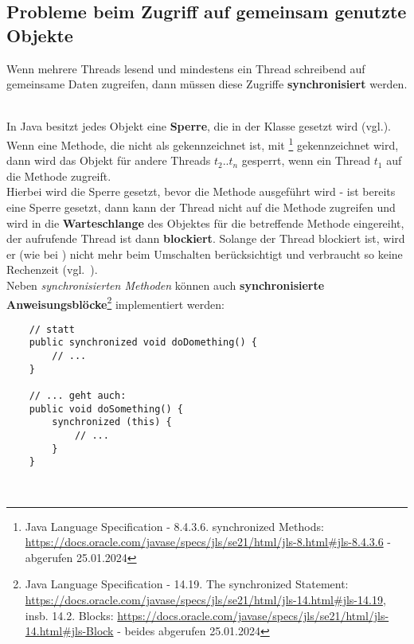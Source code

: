 \subsection{Probleme beim Zugriff auf gemeinsam genutzte Objekte}

\begin{tcolorbox}
   Wenn mehrere Threads lesend und mindestens ein Thread schreibend auf gemeinsame Daten zugreifen, dann müssen diese Zugriffe \textbf{synchronisiert} werden.
\end{tcolorbox}\\

In Java besitzt jedes Objekt eine \textbf{Sperre}, die in der Klasse  gesetzt wird (vgl.\cite[26]{Oec22}).\\

\noindent
Wenn eine Methode, die nicht als  gekennzeichnet ist, mit \footnote{
    Java Language Specification - 8.4.3.6. synchronized Methods: \url{https://docs.oracle.com/javase/specs/jls/se21/html/jls-8.html#jls-8.4.3.6} - abgerufen 25.01.2024
} gekennzeichnet wird, dann wird das Objekt für andere Threads $t_2..t_n$ gesperrt, wenn ein Thread $t_1$ auf die Methode zugreift.\\
Hierbei wird die Sperre gesetzt, bevor die Methode ausgeführt wird - ist bereits eine Sperre gesetzt, dann kann der Thread nicht auf die Methode zugreifen und wird in die \textbf{Warteschlange} des Objektes für die betreffende Methode eingereiht, der aufrufende Thread ist dann \textbf{blockiert}.
Solange der Thread blockiert ist, wird er (wie bei ) nicht mehr beim Umschalten berücksichtigt und verbraucht so keine Rechenzeit (vgl.~\cite[26]{Oec22}).
\\

\noindent
Neben \textit{synchronisierten Methoden} können auch \textbf{synchronisierte Anweisungsblöcke}\footnote{
Java Language Specification - 14.19. The synchronized Statement: \url{https://docs.oracle.com/javase/specs/jls/se21/html/jls-14.html#jls-14.19}, insb. 14.2. Blocks: \url{https://docs.oracle.com/javase/specs/jls/se21/html/jls-14.html#jls-Block} - beides abgerufen 25.01.2024
} implementiert werden:\\

\begin{verbatim}
    // statt
    public synchronized void doDomething() {
        // ...
    }

    // ... geht auch:
    public void doSomething() {
        synchronized (this) {
            // ...
        }
    }
\end{verbatim}\\

